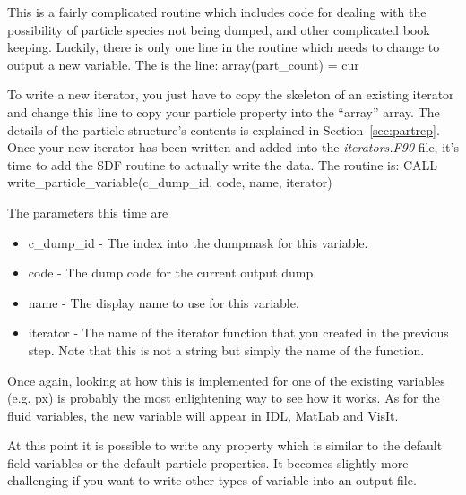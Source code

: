 \documentclass[12pt,a4paper]{article}
\newcommand{\sect}[1]{Section~\ref{sec:#1}}
\newenvironment{boxverbatim}{\lboxverbatim{none}}{\endlboxverbatim}
\begin{document}
This is a fairly complicated routine which includes code for dealing with the
possibility of particle species not being dumped, and other complicated
book keeping. Luckily, there is only one line in the routine which needs to
change to output a new variable. The is the line:
\begin{boxverbatim}
        array(part_count) = cur%
\end{boxverbatim}

To write a new iterator, you just have to copy the skeleton of an existing
iterator and change this line to copy your particle property into the ``array''
array. The details of the particle structure's contents is explained in
\sect{partrep}. Once your new iterator has been written and added into
the {\it iterators.F90} file, it's time to add the SDF routine to actually
write the data. The routine is:
\begin{boxverbatim}
    CALL write_particle_variable(c_dump_id, code, name, iterator)
\end{boxverbatim}

The parameters this time are
\begin{itemize}
\item c\_dump\_id - The index into the dumpmask for this variable.
\item code - The dump code for the current output dump.
\item name - The display name to use for this variable.
\item iterator - The name of the iterator function that you created in
  the previous step. Note that this is not a string but simply the name of the
  function.
\end{itemize}

Once again, looking at how this is implemented for one of the existing
variables (e.g. px) is probably the most enlightening way to see how it
works. As for the fluid variables, the new variable will appear in IDL, MatLab
and VisIt.

At this point it is possible to write any property which is similar to the
default field variables or the default particle properties. It becomes slightly
more challenging if you want to write other types of variable into an output
file.

\pagebreak
\end{document}
